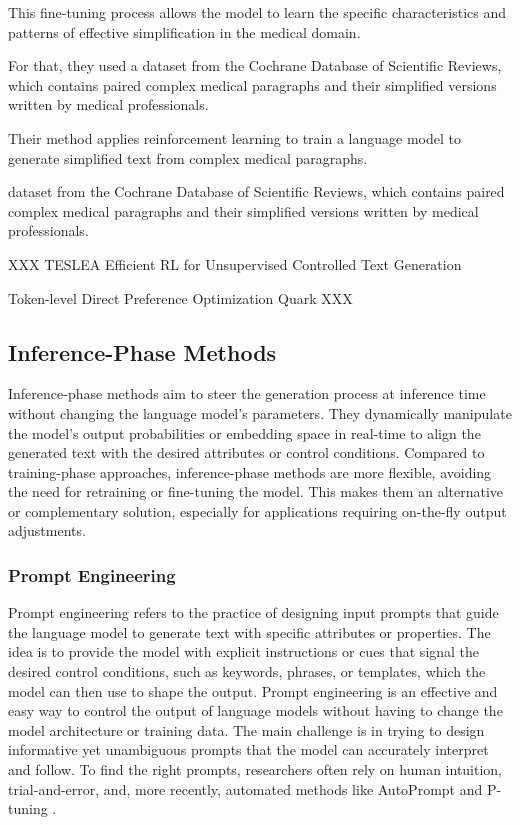 This fine-tuning process allows the model to learn the specific characteristics and patterns of effective simplification in the medical domain.


For that, they used a dataset from the Cochrane Database of Scientific Reviews, which contains paired complex medical paragraphs and their simplified versions written by medical professionals.

Their method applies reinforcement learning to train a language model to generate simplified text from complex medical paragraphs.

dataset from the Cochrane Database of Scientific Reviews, which contains paired complex medical paragraphs and their simplified versions written by medical professionals.


XXX
TESLEA
Efficient RL for Unsupervised Controlled Text Generation

Token-level Direct Preference Optimization
Quark
XXX

\subsection{Inference-Phase Methods}
Inference-phase methods aim to steer the generation process at inference time without changing the language model's parameters.
They dynamically manipulate the model's output probabilities or embedding space in real-time to align the generated text with the desired attributes or control conditions.
Compared to training-phase approaches, inference-phase methods are more flexible, avoiding the need for retraining or fine-tuning the model.
This makes them an alternative or complementary solution, especially for applications requiring on-the-fly output adjustments.

\subsubsection{Prompt Engineering}
Prompt engineering refers to the practice of designing input prompts that guide the language model to generate text with specific attributes or properties. 
The idea is to provide the model with explicit instructions or cues that signal the desired control conditions, such as keywords, phrases, or templates, which the model can then use to shape the output.
Prompt engineering is an effective and easy way to control the output of language models without having to change the model architecture or training data.
The main challenge is in trying to design informative yet unambiguous prompts that the model can accurately interpret and follow.
To find the right prompts, researchers often rely on human intuition, trial-and-error, and, more recently, automated methods like AutoPrompt \cite{shin-etal-2020-autoprompt} and P-tuning \cite{liu-etal-2022-p}.

